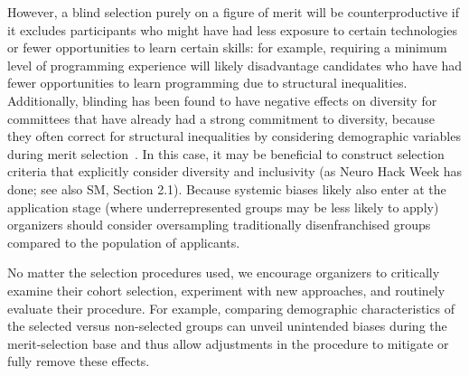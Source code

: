 However, a blind selection purely on a figure of merit will be counterproductive if it excludes participants who might have had less exposure to certain technologies or fewer opportunities to learn certain skills: for example, requiring a minimum level of programming experience will likely disadvantage candidates who have had fewer opportunities to learn programming due to structural inequalities. 
Additionally, blinding has been found to have negative effects on diversity for committees that have already had a strong commitment to diversity, because they often correct for structural inequalities by considering demographic variables during merit selection~\cite{behaghel2015unintended}.
In this case, it may be beneficial to construct selection criteria that explicitly consider diversity and inclusivity (as Neuro Hack Week has done; see also SM, Section 2.1). 
Because systemic biases likely also enter at the application stage (where underrepresented groups may be less likely to apply) organizers should consider oversampling traditionally disenfranchised groups compared to the population of applicants. 

No matter the selection procedures used, we encourage organizers to critically examine their cohort selection, experiment with new approaches, and routinely evaluate their procedure. For example, comparing demographic characteristics of the selected versus non-selected groups can unveil unintended biases during the merit-selection base and thus allow adjustments in the procedure to mitigate or fully remove these effects.
